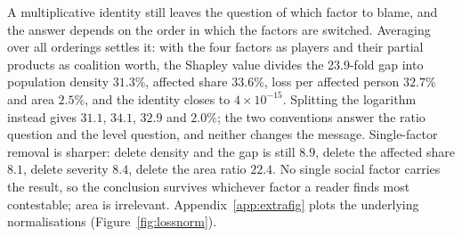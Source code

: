 A multiplicative identity still leaves the question of which factor to blame, and the answer depends on the order in which the factors are switched. Averaging over all orderings settles it: with the four factors as players and their partial products as coalition worth, the Shapley value divides the 23.9-fold gap into population density $31.3\%$, affected share $33.6\%$, loss per affected person $32.7\%$ and area $2.5\%$, and the identity closes to $4\times10^{-15}$. Splitting the logarithm instead gives $31.1$, $34.1$, $32.9$ and $2.0\%$; the two conventions answer the ratio question and the level question, and neither changes the message. Single-factor removal is sharper: delete density and the gap is still $8.9$, delete the affected share $8.1$, delete severity $8.4$, delete the area ratio $22.4$. No single social factor carries the result, so the conclusion survives whichever factor a reader finds most contestable; area is irrelevant. Appendix~\ref{app:extrafig} plots the underlying normalisations (Figure~\ref{fig:lossnorm}).
